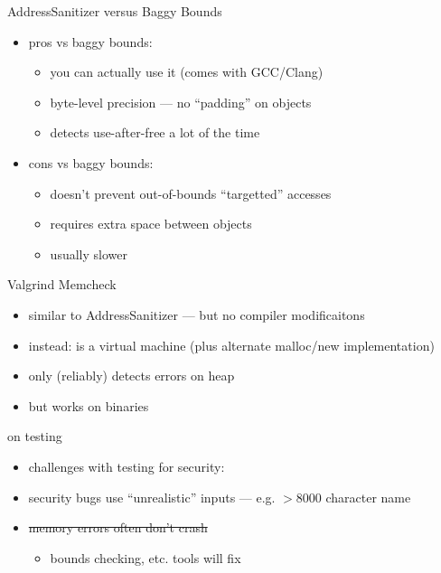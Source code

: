 \begin{frame}{AddressSanitizer versus Baggy Bounds}
    \begin{itemize}
    \item pros vs baggy bounds:
        \begin{itemize}
        \item you can actually use it (comes with GCC/Clang)
        \item byte-level precision --- no ``padding'' on objects
        \item detects use-after-free a lot of the time
        \end{itemize}
    \item cons vs baggy bounds:
        \begin{itemize}
        \item doesn't prevent out-of-bounds ``targetted'' accesses
        \item requires extra space between objects
        \item usually slower
        \end{itemize}
    \end{itemize}
\end{frame}


\begin{frame}{Valgrind Memcheck}
    \begin{itemize}
    \item similar to AddressSanitizer --- but no compiler modificaitons
    \item instead: is a virtual machine (plus alternate malloc/new implementation)
    \vspace{.5cm}
    \item only (reliably) detects errors on heap
    \item but works on  binaries
    \end{itemize}
\end{frame}


\begin{frame}{on testing}
    \begin{itemize}
    \item challenges with testing for security:
    \vspace{.5cm}
    \item security bugs use ``unrealistic'' inputs --- e.g. $>8000$ character name
    \item \sout<2>{memory errors often don't crash}
        \begin{itemize}
        \item<2> bounds checking, etc. tools will fix
        \end{itemize}
    \end{itemize}
\end{frame}

